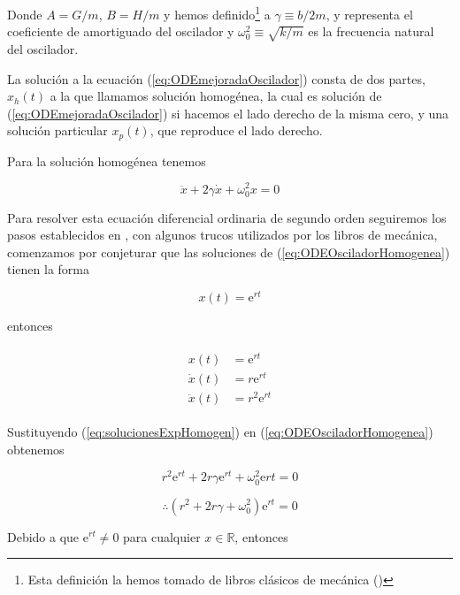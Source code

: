 \documentclass[a4paper,10pt]{article}
\newcommand{\euler}{\mathrm{e}}
\begin{document}
Donde $A = G/m$, $B = H/m$ y hemos definido\footnote{Esta definición la hemos tomado de libros clásicos de mecánica (\cite{marion,taylor})} 
a  $\gamma \equiv b/2m$, y representa el coeficiente de amortiguado del oscilador 
y $\omega_0^2 \equiv \sqrt{k/m}$ es la frecuencia natural del oscilador. 

\vspace{.3cm}

La solución a la ecuación (\ref{eq:ODEmejoradaOscilador}) consta de dos partes,
$x_h(t)$ a la que llamamos solución homogénea, la cual es solución de (\ref{eq:ODEmejoradaOscilador})
si hacemos el lado derecho de la misma cero, y una solución particular $x_p(t)$, que 
reproduce el lado derecho. 

\vspace{.3cm}

Para la solución homogénea tenemos 

\begin{equation}
 \ddot{x} + 2 \gamma \dot{x} + \omega_0^2 x = 0 
 \label{eq:ODEOsciladorHomogenea}
\end{equation}

Para resolver esta ecuación diferencial ordinaria de segundo orden seguiremos los pasos
establecidos en \cite{zill}, con algunos trucos utilizados por los libros de mecánica,
comenzamos por conjeturar que las soluciones de (\ref{eq:ODEOsciladorHomogenea}) tienen 
la forma 

$$
x(t) = \euler^{rt}
$$

entonces

\begin{align}
 \begin{split}
  x(t) &= \euler^{rt} \\
  \dot{x}(t) &= r\euler^{rt} \\
  \ddot{x}(t) &= r^2\euler^{rt} 
  \label{eq:solucionesExpHomogen}
 \end{split}
\end{align}

Sustituyendo (\ref{eq:solucionesExpHomogen}) en (\ref{eq:ODEOsciladorHomogenea}) obtenemos

\begin{equation}
 r^2 \euler^{rt} + 2r\gamma \euler^{rt} + \omega_0^2 \euler{rt} = 0
 \label{eq:CasiCaracteristica}
\end{equation}

$$
\therefore \left(r^2 + 2r\gamma + \omega_0^2\right) \euler^{rt} = 0
$$

Debido a que $\euler^{rt} \neq 0$ para cualquier $x \in \mathbb{R}$, entonces
\end{document}
